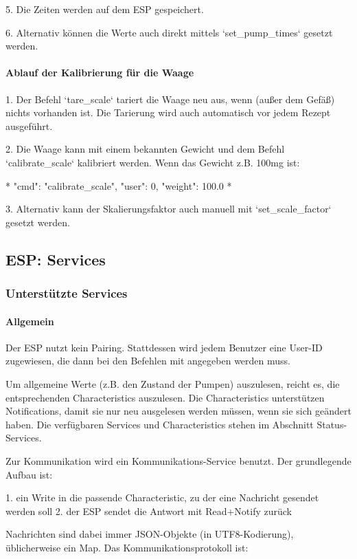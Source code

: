 5. Die Zeiten werden auf dem ESP gespeichert.

6. Alternativ können die Werte auch direkt mittels `set\_pump\_times` gesetzt werden.


\paragraph{ Ablauf der Kalibrierung für die Waage}

1. Der Befehl `tare\_scale` tariert die Waage neu aus, wenn (außer dem Gefäß) nichts vorhanden ist. Die Tarierung wird auch automatisch vor jedem Rezept ausgeführt.

2. Die Waage kann mit einem bekannten Gewicht und dem Befehl `calibrate\_scale` kalibriert werden. Wenn das Gewicht z.B. 100mg ist:

*
{"cmd": "calibrate\_scale", "user": 0, "weight": 100.0}
*

3. Alternativ kann der Skalierungsfaktor auch manuell mit `set\_scale\_factor` gesetzt werden.


\subsection{ESP: Services}
\subsubsection{ Unterstützte Services}

\paragraph{Allgemein}

Der ESP nutzt kein Pairing. Stattdessen wird jedem Benutzer eine User-ID zugewiesen, die dann bei den Befehlen mit angegeben werden muss.

Um allgemeine Werte (z.B. den Zustand der Pumpen) auszulesen, reicht es, die entsprechenden Characteristics auszulesen. Die Characteristics unterstützen Notifications, damit sie nur neu ausgelesen werden müssen, wenn sie sich geändert haben. Die verfügbaren Services und Characteristics stehen im Abschnitt Status-Services.

Zur Kommunikation wird ein Kommunikations-Service benutzt. Der grundlegende Aufbau ist:

1. ein Write in die passende Characteristic, zu der eine Nachricht gesendet werden soll
2. der ESP sendet die Antwort mit Read+Notify zurück

Nachrichten sind dabei immer JSON-Objekte (in UTF8-Kodierung), üblicherweise ein Map. Das Kommunikationsprotokoll ist:

